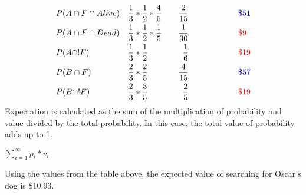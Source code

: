 \begin{align*}
    &P(A \cap F \cap Alive) &\dfrac{1}{3}&*\dfrac{1}{2}*\dfrac{4}{5} \hspace{10pt}     &\dfrac{2}{15} \hspace{60pt} &{\color{blue}\$51}\\
    &P(A \cap F \cap Dead) &\dfrac{1}{3}&*\dfrac{1}{2}*\dfrac{1}{5} \hspace{10pt}     &\dfrac{1}{30} \hspace{60pt} &{\color{red}\$9}\\
    &P(A \cap !F) &\dfrac{1}{3}&*\dfrac{1}{2}\hspace{10pt}     &\dfrac{1}{6} \hspace{60pt}  &{\color{red}\$19}\\
    &P(B \cap F) &\dfrac{2}{3}&*\dfrac{2}{5}\hspace{10pt}     &\dfrac{4}{15} \hspace{60pt}  &{\color {blue}\$57}\\
    &P(B \cap !F) &\dfrac{2}{3}&*\dfrac{3}{5}\hspace{10pt}     &\dfrac{2}{5} \hspace{60pt} &{\color{red}\$19}\\
\end{align*}
Expectation is calculated as the sum of the multiplication of probability and value divided by the total probability. In this case, the total value of probability adds up to 1. \\
\begin{center}
    $\sum_{i=1}^{\infty} p_i*v_i$
\end{center}
Using the values from the table above, the expected value of searching for Oscar's dog is \$10.93.